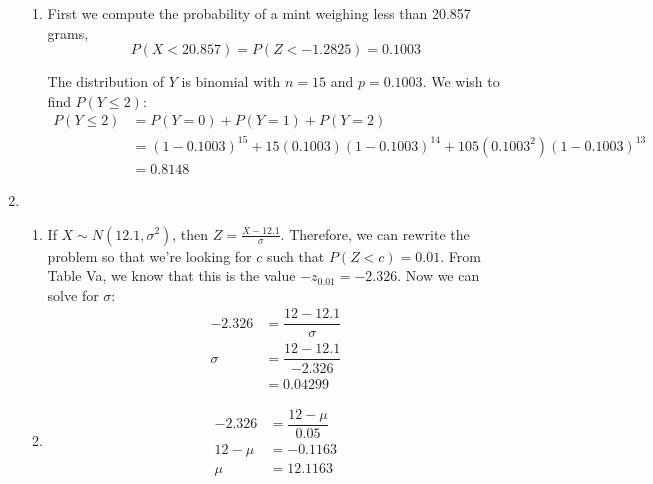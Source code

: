 \documentclass{article}
\begin{document}
\begin{enumerate}
\begin{enumerate}
       \item
	First we compute the probability of a mint weighing less than 20.857 grams, 
	  $$P(X < 20.857) = P(Z < -1.2825) = 0.1003$$
	  
	The distribution of $Y$ is binomial with $n=15$ and $p=0.1003$. We wish to find $P(Y \le 2)$:
	  \begin{align*}
	   P(Y \le 2) &= P(Y = 0) + P(Y = 1) + P(Y = 2) \\
	    &= (1 - 0.1003)^{15} + 15(0.1003)(1 - 0.1003)^14 + 105(0.1003^2)(1 - 0.1003)^13 \\
	    &= 0.8148
	  \end{align*}
      \end{enumerate}
     \addtocounter{enumi}{3}
     
     \item
      \begin{enumerate}
       \item 
	If $X \sim N(12.1, \sigma^2)$, then $Z = \frac{X - 12.1}{\sigma}$. Therefore, we can rewrite
	the problem so that we're looking for $c$ such that $P(Z < c) = 0.01$. From Table Va, we know
	that this is the value $-z_{0.01} = -2.326$. Now we can solve for $\sigma$:
	  \begin{align*}
	    -2.326 &= \dfrac{12 - 12.1}{\sigma} \\
	    \sigma &= \dfrac{12 - 12.1}{-2.326} \\
	      &= 0.04299
	  \end{align*}
       
       \item
	\begin{align*}
	  -2.326 &= \dfrac{12 - \mu}{0.05} \\
	  12 - \mu &= -0.1163 \\
	  \mu &= 12.1163
	\end{align*}

       
      \end{enumerate}
    \end{enumerate}
\end{document}
